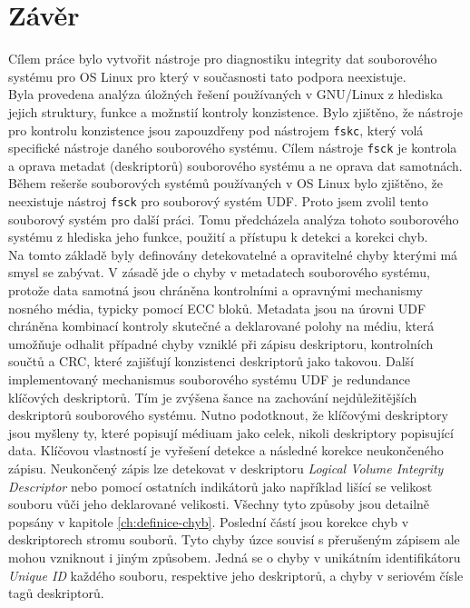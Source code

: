 \chapter{Závěr}
Cílem práce bylo vytvořit nástroje pro diagnostiku integrity dat souborového systému pro OS Linux pro který v současnosti tato podpora neexistuje.\\
Byla provedena analýza úložných řešení používaných v GNU/Linux z hlediska jejich struktury, funkce a možnstií kontroly konzistence. Bylo zjištěno, že nástroje pro kontrolu konzistence jsou zapouzdřeny pod nástrojem \texttt{fskc}, který volá specifické nástroje daného souborového systému. Cílem nástroje \texttt{fsck} je kontrola a oprava metadat (deskriptorů) souborového systému a ne oprava dat samotnách.\\
Během rešerše souborových systémů používaných v OS Linux bylo zjištěno, že neexistuje nástroj \texttt{fsck} pro souborový systém UDF. Proto jsem zvolil tento souborový systém pro další práci. Tomu předcházela analýza tohoto souborového systému z hlediska jeho funkce, použití a přístupu k detekci a korekci chyb.\\
Na tomto základě byly definovány detekovatelné a opravitelné chyby kterými má smysl se zabývat. V zásadě jde o chyby v metadatech souborového systému, protože data samotná jsou chráněna kontrolními a opravnými mechanismy nosného média, typicky pomocí ECC bloků. Metadata jsou na úrovni UDF chráněna kombinací kontroly skutečné a deklarované polohy na médiu, která umožňuje odhalit případné chyby vzniklé při zápisu deskriptoru, kontrolních součtů a CRC, které zajišťují konzistenci deskriptorů jako takovou. Další implementovaný mechanismus souborového systému UDF je redundance klíčových deskriptorů. Tím je zvýšena šance na zachování nejdůležitějších deskriptorů souborového systému. Nutno podotknout, že klíčovými deskriptory jsou myšleny ty, které popisují médiuam jako celek, nikoli deskriptory popisující data. Klíčovou vlastností je vyřešení detekce a následné korekce neukončeného zápisu. Neukončený zápis lze detekovat v deskriptoru \textit{Logical Volume Integrity Descriptor} nebo pomocí ostatních indikátorů jako například lišící se velikost souboru vůči jeho deklarované velikosti. Všechny tyto způsoby jsou detailně popsány v kapitole \ref{ch:definice-chyb}. Poslední částí jsou korekce chyb v deskriptorech stromu souborů. Tyto chyby úzce souvisí s přerušeným zápisem ale mohou vzniknout i jiným způsobem. Jedná se o chyby v unikátním identifikátoru \textit{Unique ID} každého souboru, respektive jeho deskriptorů, a chyby v seriovém čísle tagů deskriptorů.\\
